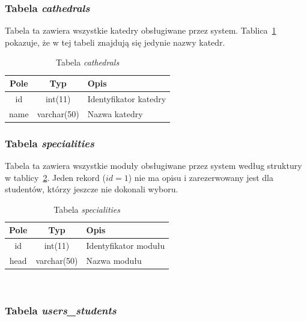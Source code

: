 \documentclass[a4paper,12pt,oneside]{report}
\begin{document}
\subsubsection{Tabela \emph{cathedrals}}
\label{subsub:cathedrals}

Tabela ta zawiera wszystkie katedry obsługiwane przez system. Tablica~\ref{tab:cathedrals} pokazuje, że w tej tabeli znajdują się jedynie nazwy katedr.
\begin{table}[h]
  \centering
  \begin{tabular}{|c|c|l|}\hline
  Pole & Typ & Opis \\\hline
  id              & int(11)      & Identyfikator katedry\\
  name & varchar(50) & Nazwa katedry \\\hline
  \end{tabular}
  \caption{Tabela \emph{cathedrals}\label{tab:cathedrals}}
\end{table}

\subsubsection{Tabela \emph{specialities}}
\label{subsub:specialities}

Tabela ta zawiera wszystkie moduły obsługiwane przez system według struktury w tablicy~\ref{tab:specialities}. Jeden rekord ($id = 1$) nie ma opisu i zarezerwowany jest dla studentów, którzy jeszcze nie dokonali wyboru.
\begin{table}[h]
  \centering
  \begin{tabular}{|c|c|l|}\hline
  Pole & Typ & Opis \\\hline
  id              & int(11)      & Identyfikator modułu\\
  head & varchar(50) & Nazwa modułu \\\hline
  \end{tabular}
  \caption{Tabela \emph{specialities}\label{tab:specialities}}
\end{table}

~\newline

\subsubsection{Tabela \emph{users\_students}}
\label{subsub:users_students}
\end{document}
